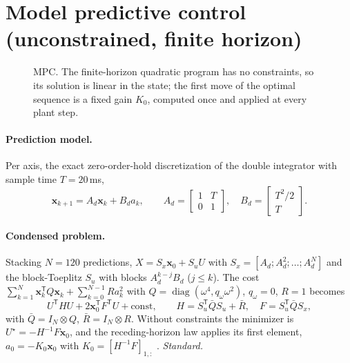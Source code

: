 \documentclass[11pt]{article}
\newcommand{\srcroot}{../..}
\newcommand{\T}{^{\mathsf T}}
\theoremstyle{remark}
\newcommand{\listing}[4]{%
  \Needspace{8\baselineskip}%
  }
\newcommand{\archfig}[3]{%
  \begin{figure}[H]\centering\resizebox{\textwidth}{!}{}\caption{#2}\label{#3}\end{figure}}
\begin{document}
\listing{experiments/nengo_nef_replication_2026-08-29/run_mujoco_nef_baselines.py}{142}{149}{$\lambda=\omega$, $\eta=0.5\,\bm\ell\oslash\bm J$, $\phi=\eta/\omega$}
\listing{experiments/nengo_nef_replication_2026-08-29/run_mujoco_nef_baselines.py}{234}{236}{\eqref{eq:smc}}

\section{Model predictive control (unconstrained, finite horizon)}\label{sec:mpc}
\archfig{fig_mpc.tex}{MPC. The finite-horizon quadratic program has no constraints, so its solution is linear in the state; the
first move of the optimal sequence is a fixed gain $K_0$, computed once and applied at every plant step.}{fig:mpc}

\paragraph{Prediction model.} Per axis, the exact zero-order-hold discretization of the double integrator with sample time
$T=20$\,ms,
\[
\bm x_{k+1}=A_d\bm x_k+B_da_k,\qquad A_d=\begin{bmatrix}1&T\\0&1\end{bmatrix},\quad B_d=\begin{bmatrix}T^2/2\\T\end{bmatrix}.
\]
\paragraph{Condensed problem.} Stacking $N=120$ predictions, $X=S_x\bm x_0+S_uU$ with
$S_x=[A_d;A_d^2;\dots;A_d^N]$ and the block-Toeplitz $S_u$ with blocks $A_d^{k-j}B_d$ ($j\le k$). The cost
$\sum_{k=1}^{N}\bm x_k\T Q\bm x_k+\sum_{k=0}^{N-1}Ra_k^2$ with $Q=\operatorname{diag}(\omega^4,q_\omega\omega^2)$, $q_\omega=0$, $R=1$ becomes
\[
U\T HU+2\bm x_0\T F\T U+\text{const},\qquad H=S_u\T\bar QS_u+\bar R,\quad F=S_u\T\bar QS_x,
\]
with $\bar Q=I_N\otimes Q$, $\bar R=I_N\otimes R$. Without constraints the minimizer is $U^\star=-H^{-1}F\bm x_0$, and the
receding-horizon law applies its first element, $a_0=-K_0\bm x_0$ with $K_0=[H^{-1}F]_{1,:}$
\cite{borrelli2017predictive,rawlings2017mpc}. \emph{Standard.}
\end{document}

